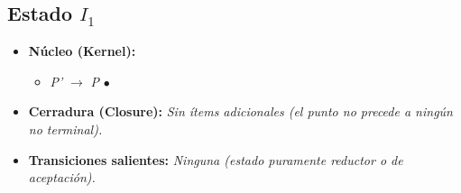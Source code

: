 \documentclass[12pt, letterpaper]{article}
\begin{document}
\subsection*{Estado $I_{1}$ }
\begin{itemize}\setlength{\itemsep}{1pt}\setlength{\parskip}{0pt}
\item \textbf{Núcleo (Kernel):}
\begin{itemize}\setlength{\itemsep}{1pt}\setlength{\parskip}{0pt}
    \item \textit{P'} $\to$ \textit{P} $\bullet$ \quad {\color{accent}\textbf{[Accept]}}
\end{itemize}
\item \textbf{Cerradura (Closure):} \emph{Sin ítems adicionales (el punto no precede a ningún no terminal).}
\item \textbf{Transiciones salientes:} \emph{Ninguna (estado puramente reductor o de aceptación).}
\end{itemize}
\vspace{2pt}
\end{document}
